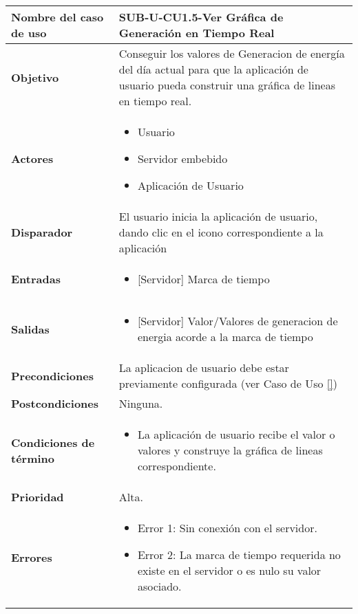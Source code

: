 \begin{longtable}{|J{5cm}|J{10.3cm}|}
	\hline
	\textbf{Nombre del caso de uso} &
		SUB-U-CU1.5-Ver Gráfica de Generación en Tiempo Real \\ \hline
	\textbf{Objetivo} &
		Conseguir los valores de Generacion de energía del día actual para que la aplicación de usuario pueda construir una gráfica de lineas en tiempo real. \\ \hline
	\textbf{Actores} &
		\begin{itemize}
		    \item Usuario
			\item Servidor embebido
			\item Aplicación de Usuario
		\end{itemize} \\ \hline
	\textbf{Disparador} & 
	    El usuario inicia la aplicación de usuario, dando clic en el icono correspondiente a la aplicación\\ \hline 
	\textbf{Entradas} & 
		\begin{itemize}
				\item{[Servidor]} Marca de tiempo
		\end{itemize}\\ \hline 
	\textbf{Salidas} & 
		\begin{itemize}
			\item{[Servidor]} Valor/Valores de generacion de energia acorde a la marca de tiempo
		\end{itemize} \\ \hline
	\textbf{Precondiciones} &
		La aplicacion de usuario debe estar previamente configurada (ver Caso de Uso \ref{}) \\ \hline
	\textbf{Postcondiciones} &
		Ninguna.\\ \hline
	\textbf{Condiciones de término} & 
		\begin{itemize}
			\item La aplicación de usuario recibe el valor o valores y construye la gráfica de lineas correspondiente.
		\end{itemize} \\ \hline 
	\textbf{Prioridad} & 
		Alta. \\ \hline
	\textbf{Errores} & 
		\begin{itemize}
		    \item \label{CU5:Error1} Error 1: Sin conexión con el servidor.
			\item \label{CU5:Error2} Error 2: La marca de tiempo requerida no existe en el servidor o es nulo su valor asociado.

\end{itemize}
\end{longtable}
